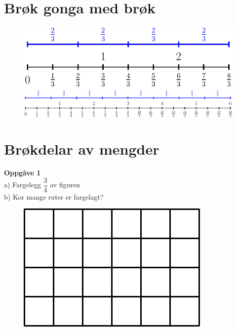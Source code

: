 





\large
\section*{Brøk gonga med brøk}

\begin{figure}
	\centering
	\includegraphics[angle=90]{tallinje3} \hspace{5cm}
	\includegraphics[angle=90]{tallinje4}
\end{figure}

\newpage
\section*{Brøkdelar av mengder}
\textbf{Oppgåve 1} \\
a) Fargelegg $ \dfrac{3}{4} $ av figuren\\
b) Kor mange ruter er fargelagt?
\begin{figure}
	\includegraphics{farg3_4}
\end{figure} \vspace{10pt}

